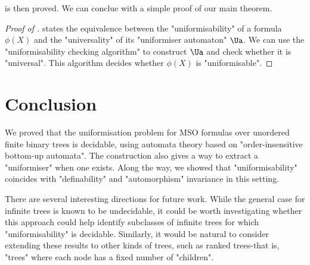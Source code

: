 \documentclass[a4paper,UKenglish,cleveref, autoref, thm-restate]{lipics-v2021}
\begin{document}
 is then proved. We can conclue with a simple proof of our main theorem.

\begin{proof}[Proof of ]
	 states the equivalence between the "uniformisability" of a formula $\phi(X)$ and the "universality" of its "uniformiser automaton" $\Ua$.
	We can use the "uniformisability checking algorithm" to construct $\Ua$ and check whether it is "universal". This algorithm decides whether $\phi(X)$ is "uniformisable".
\end{proof}

\section{Conclusion}\label{sec:conclusion}

We proved that the uniformisation problem for MSO formulas over unordered finite binary trees is decidable, using automata theory based
on "order-insensitive bottom-up automata". The construction also gives a way to extract a "uniformiser" when one exists. Along the way,
we showed that "uniformisability" coincides with "definability" and "automorphism" invariance in this setting.

There are several interesting directions for future work. While the general case for infinite trees is known to be undecidable,
it could be worth investigating whether this approach could help identify subclasses of infinite trees for which "uniformisability" is decidable. 
Similarly, it would be natural to consider extending these results to other kinds of trees, such as ranked trees-that is, "trees" where each node has a fixed number of "children". 







\end{document}
